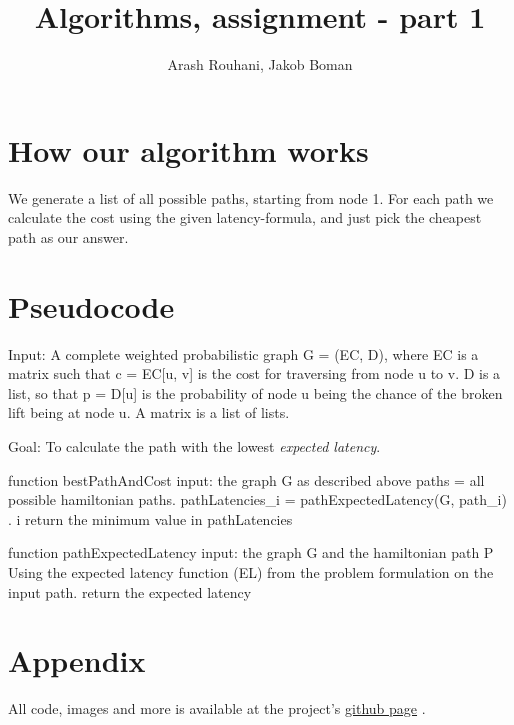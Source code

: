 \documentclass[a4paper,11pt]{article}
\title{Algorithms, assignment - part 1}
\author{Arash Rouhani, Jakob Boman}
\begin{document}
\maketitle

\section{How our algorithm works}
We generate a list of all possible paths, starting from node 1. For each path we calculate the cost using the given latency-formula, and just pick the cheapest path as our answer.

\section{Pseudocode}
Input: A complete weighted probabilistic graph G = (EC, D), where EC is a
matrix such that c = EC[u, v] is the cost for traversing from node u to v.
D is a list, so that p = D[u] is the probability of node u being
the chance of the broken lift being at node u.
A matrix is a list of lists.

Goal: To calculate the path with the lowest \emph{expected latency}.

function bestPathAndCost
input: the graph G as described above
    paths = all possible hamiltonian paths.
    pathLatencies_i = pathExpectedLatency(G, path_i) \forall. i
    return the minimum value in pathLatencies

function pathExpectedLatency
input: the graph G and the hamiltonian path P
    Using the expected latency function (EL) from the problem formulation on the input path.
    return the expected latency



\section{Appendix}
All code, images and more is available at the project's \href{https://github.com/biforboman/Algorithms-TIN092}{github page} .
\end{document}
